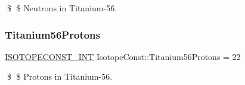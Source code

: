 \$ \$ Neutrons in Titanium-\/56. \mbox{\label{group___isotope_const-_titanium-_ti56_ga25c76c976bf1a2342878a7973c083ddc}} 
\subsubsection{\texorpdfstring{Titanium56\+Protons}{Titanium56Protons}}
{\footnotesize\ttfamily \mbox{\hyperlink{group___isotope_const-_macros_ga5f18360b3e99483a35c32d789e62621c}{I\+S\+O\+T\+O\+P\+E\+C\+O\+N\+S\+T\+\_\+\+I\+NT}} Isotope\+Const\+::\+Titanium56\+Protons = 22}

\$ \$ Protons in Titanium-\/56. 